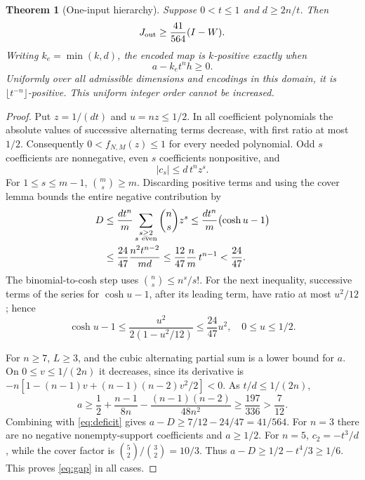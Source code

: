 \documentclass[11pt,a4paper]{article}
\newtheorem{theorem}{Theorem}
\begin{document}
\begin{theorem}[One-input hierarchy]\label{thm:odd}
Suppose \(0<t\le1\) and \(d\ge2n/t\). Then
\begin{equation}\label{eq:gap}
 J_{\rm out}\ge\frac{41}{564}(I-W).
\end{equation}
Writing \(k_e=\min(k,d)\), the encoded map is \(k\)-positive exactly when
\begin{equation}\label{eq:criterion}
 a-k_e t^n h\ge0.
\end{equation}
Uniformly over all admissible dimensions and encodings in this domain, it is
\(\lfloor t^{-n}\rfloor\)-positive. This uniform integer order cannot be increased.
\end{theorem}
\begin{proof}
Put \(z=1/(dt)\) and \(u=nz\le1/2\). In all coefficient polynomials the absolute values of successive alternating terms decrease, with first ratio at most \(1/2\). Consequently \(0<f_{N,M}(z)\le1\) for every needed polynomial. Odd \(s\) coefficients are nonnegative, even \(s\) coefficients nonpositive, and
\[
 |c_s|\le d\,t^n z^s.
\]
For \(1\le s\le m-1\), \(\binom ms\ge m\). Discarding positive terms and using the cover lemma bounds the entire negative contribution by
\begin{align}
 D&\le\frac{dt^n}{m}\sum_{\substack{s\ge2\\s\ {\rm even}}}\binom ns z^s
 \le\frac{dt^n}{m}\bigl(\cosh u-1\bigr) \nonumber\\
 &\le\frac{24}{47}\frac{n^2t^{n-2}}{md}
 \le\frac{12}{47}\frac nm\,t^{n-1}<\frac{24}{47}.
 \label{eq:deficit}
\end{align}
The binomial-to-cosh step uses \(\binom ns\le n^s/s!\). For the next inequality, successive terms of the series for \(\cosh u-1\), after its leading term, have ratio at most \(u^2/12\); hence
\[
 \cosh u-1\le\frac{u^2}{2(1-u^2/12)}
             \le\frac{24}{47}u^2,\quad 0\le u\le1/2.
\]

For \(n\ge7\), \(L\ge3\), and the cubic alternating partial sum is a lower bound for \(a\). On \(0\le v\le1/(2n)\) it decreases, since its derivative is
\(-n[1-(n-1)v+(n-1)(n-2)v^2/2]<0\). As \(t/d\le1/(2n)\),
\[
 a\ge\frac12+\frac{n-1}{8n}
          -\frac{(n-1)(n-2)}{48n^2}
   \ge\frac{197}{336}>\frac7{12}.
\]
Combining with \eqref{eq:deficit} gives
\(a-D\ge7/12-24/47=41/564\).
For \(n=3\) there are no negative nonempty-support coefficients and \(a\ge1/2\).
For \(n=5\), \(c_2=-t^3/d\), while the cover factor is
\(\binom52/\binom32=10/3\). Thus
\(a-D\ge1/2-t^4/3\ge1/6\). This proves \eqref{eq:gap} in all cases.


\end{proof}
\end{document}
